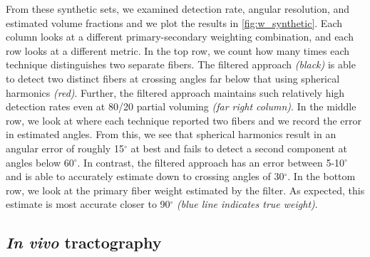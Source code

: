 \documentclass[final,hyperref]{gatech-thesis}
\renewcommand{\deg}{\ensuremath{^\circ}\xspace}
\begin{document}
From these synthetic sets, we examined detection rate, angular resolution, and
estimated volume fractions and we plot the results in \autoref{fig:w_synthetic}.
Each column looks at a different primary-secondary weighting combination, and
each row looks at a different metric.
%
In the top row, we count how many times each technique distinguishes two
separate fibers.  The filtered approach \textit{(black)} is able to detect two
distinct fibers at crossing angles far below that using spherical harmonics
\textit{(red)}.  Further, the filtered approach maintains such relatively high
detection rates even at 80/20 partial voluming \textit{(far right column)}.
%
In the middle row, we look at where each technique reported two fibers and we
record the error in estimated angles.  From this, we see that spherical
harmonics result in an angular error of roughly 15\deg at best and fails to
detect a second component at angles below 60\deg.  In contrast, the filtered
approach has an error between 5-10\deg and is able to accurately estimate down
to crossing angles of 30\deg.
%
In the bottom row, we look at the primary fiber weight estimated by the
filter.  As expected, this estimate is most accurate closer to 90\deg
\textit{(blue line indicates true weight)}.


\subsection{\textit{In vivo} tractography}  \label{sec:w_real}
\end{document}
